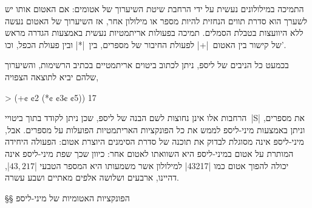 התמיכה במילולונים נעשית על ידי הרחבת שיטת השיערוך של אטומים: אם האטום אותו יש
לשערך הוא סדרת תווים הנחזית להיות מספר או מילולון אחר, אז השיערוך של האטום נעשה
ללא היוועצות בטבלת הסמלים. תמיכה בפעולות אריתמטיות נעשית באמצעות הגדרה מראש של
קישור בין האטום~\T|+| לפעולת החיבור של מספרים, בין~\T|*| ובין פעולת הכפל,
וכו'.

בכמעט כל הניבים של ליספ, ניתן לכתוב ביטוים אריתמטיים בכתיב הרשימות, והשיערוך
שלהם יביא לתוצאה הצפויה,

\begin{LISP}
> (+¢ ¢2 (*¢ ¢3¢ ¢5))
17
\end{LISP}

הרחבות אלו אינן נחוצות לשם הבנה של ליספ, שכן ניתן לקודד בתוך ביטויי~\E|S| את
מספרים, וניתן באמצעות מיני-ליספ לממש את כל הפונקציות האריתמטיות הפועלות על
מספרים. אבל, מיני-ליספ אינה מסוגלת לבדוק את תוכנה של סדרת הסימנים היוצרת אטום:
הפעולה היחידה המותרת על אטום במיני-ליספ היא השוואתו לאטום אחר: כיוון שכך שפת
מיני-ליספ אינה יכולה להפוך אטום כמו \T|43217| למילולון אשר משמעותו היא המספר
הטבעי \E|$43,217$|, דהיינו, ארבעים ושלושה אלפים מאתיים ושבע עשרה.

§§ הפונקציות האטומיות של מיני-ליספ 

